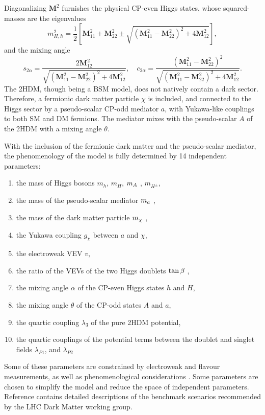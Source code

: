 Diagonalizing $\mathbf{M}^2$ furnishes the physical CP-even Higgs states, whose squared-masses are the eigenvalues
\begin{equation}
    \label{4.7}
    m^2_{H,h} = \frac{1}{2}\left[ \mathbf{M}^2_{11} + \mathbf{M}^2_{22} \pm \sqrt{(\mathbf{M}^2_{11} - \mathbf{M}^2_{22})^2 + 4\mathbf{M}^2_{12}} \right],
\end{equation}
and the mixing angle 
\begin{equation}
    \label{4.8}
    s_{2\alpha} = \frac{2\mathbf{M}^2_{12}}{\sqrt{(\mathbf{M}^2_{11} - \mathbf{M}^2_{22})^2 + 4\mathbf{M}^2_{12}}} , \quad c_{2\alpha} = \frac{(\mathbf{M}^2_{11} - \mathbf{M}^2_{22})^2}{\sqrt{(\mathbf{M}^2_{11} - \mathbf{M}^2_{22})^2 + 4\mathbf{M}^2_{12}}}.
\end{equation}
The 2HDM, though being a BSM model, does not natively contain a dark sector. Therefore, a fermionic dark matter particle $\chi$ is included, and connected to the Higgs sector by a pseudo-scalar CP-odd mediator $a$, with Yukawa-like couplings to both SM and DM fermions. The mediator mixes with the pseudo-scalar $A$ of the 2HDM with a mixing angle $\theta$. 

With the inclusion of the fermionic dark matter and the pseudo-scalar mediator, the phenomenology of the model is fully determined by 14 independent parameters:
\begin{enumerate}
    \item the mass of Higgs bosons $m_h$, $m_H$, $m_A~$, $m_{H^{\pm}}$,
    \item the mass of the pseudo-scalar mediator $m_a~$,
    \item the mass of the dark matter particle $m_{\chi}~$,
    \item the Yukawa coupling $g_{\chi}$ between $a$ and $\chi$,
    \item the electroweak VEV $v$,
    \item the ratio of the VEVs of the two Higgs doublets $\tan\beta~$,
    \item the mixing angle $\alpha$ of the CP-even Higgs states $h$ and $H$,
    \item the mixing angle $\theta$ of the CP-odd states $A$ and $a$,
    \item the quartic coupling $\lambda_3$ of the pure 2HDM potential,
    \item the quartic couplings of the potential terms between the doublet and singlet fields $\lambda_{P1}$, and $\lambda_{P2}$
\end{enumerate}
Some of these parameters are constrained by electroweak and flavour measurements, as well as phenomenological considerations \cite{Bauer:2017ota,2HDMWGproxi}. Some parameters are chosen to simplify the model and reduce the space of independent parameters. Reference \cite{2HDMWGproxi} contains detailed descriptions of the \thdma benchmark scenarios recommended by the LHC Dark Matter working group. 

